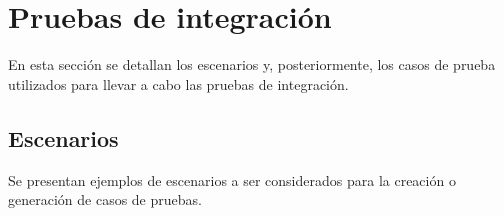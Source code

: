 \section{ Pruebas de integración }
\par En esta sección se detallan los escenarios y, posteriormente, los casos de prueba utilizados para llevar a cabo las pruebas de integración.


\subsection{Escenarios}
\par Se presentan ejemplos de escenarios a ser considerados para la creación o generación de casos de pruebas. 








